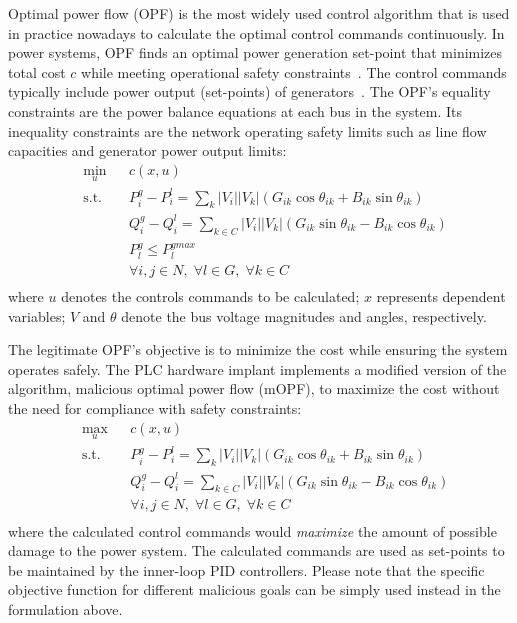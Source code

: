Optimal power flow (OPF) is the most widely used control algorithm that is used in practice nowadays to calculate the optimal control commands continuously. In power systems, OPF finds an optimal power generation set-point that minimizes total cost $c$ while meeting operational safety constraints~\cite{FERCOPF}.  The control commands typically include power output (set-points) of generators~\cite{Tinney1968}. The OPF's equality constraints are the power balance equations at each bus in the system. Its inequality constraints are the network operating safety limits such as line flow capacities and generator power output limits:
\begin{equation} \label{eqn:opf}
\begin{aligned}
& \underset{u}{\min} & & c(x, u) \\
& \text{s.t.} & &  P_i^g - P_i^l = \sum_{k}{|V_i||V_k| (G_{ik} \cos{\theta_{ik}} + B_{ik} \sin{\theta_{ik}})} \\
& & &  Q_i^g - Q_i^l = \sum_{k \in C}{|V_i||V_k| (G_{ik} \sin{\theta_{ik}} - B_{ik} \cos{\theta_{ik}})} \\
& & &  P_l^g \leq P^{gmax}_l\\
& & &  \forall i,j \in N, \; \forall l \in G, \; \forall k \in C \\
\end{aligned}
\end{equation} 
where $u$ denotes the controls commands to be calculated; $x$ represents dependent variables; $V$ and $\mathit{\theta}$ denote the bus voltage magnitudes and angles, respectively.


The legitimate OPF's objective is to minimize the cost while ensuring the system operates safely. The PLC hardware implant implements a modified version of the algorithm, malicious optimal power flow (mOPF), to maximize the cost without the need for compliance with safety constraints: 
\begin{equation} \label{eqn:opf1}
\begin{aligned}
& \underset{u}{\max} & & c(x, u) \\
& \text{s.t.} & &  P_i^g - P_i^l = \sum_{k}{|V_i||V_k| (G_{ik} \cos{\theta_{ik}} + B_{ik} \sin{\theta_{ik}})} \\
& & &  Q_i^g - Q_i^l = \sum_{k \in C}{|V_i||V_k| (G_{ik} \sin{\theta_{ik}} - B_{ik} \cos{\theta_{ik}})} \\
& & &  \forall i,j \in N, \; \forall l \in G, \; \forall k \in C \\
\end{aligned}
\end{equation} 
where the calculated control commands would \textit{maximize} the amount of possible damage to the power system. The calculated commands are used as set-points to be maintained by the inner-loop PID controllers. Please note that the specific objective function for different malicious goals can be simply used instead in the formulation above. 


